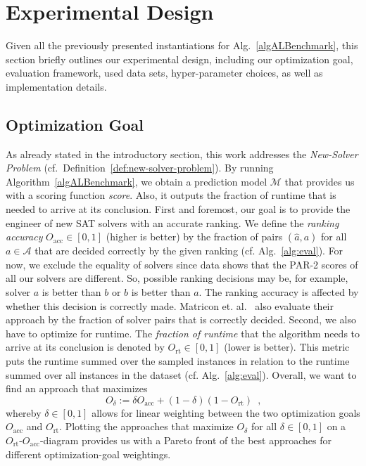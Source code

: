 \documentclass[runningheads]{llncs}
\begin{document}
\section{Experimental Design}
Given all the previously presented instantiations for Alg.~\ref{algALBenchmark}, this section briefly outlines our experimental design, including our optimization goal, evaluation framework, used data sets, hyper-parameter choices, as well as implementation details.

\subsection{Optimization Goal}
\label{sec:goal}
As already stated in the introductory section, this work addresses the \emph{New-Solver Problem} (cf.~Definition~\ref{def:new-solver-problem}).
By running Algorithm~\ref{algALBenchmark}, we obtain a prediction model $\mathcal{M}$ that provides us with a scoring function \emph{score}.
Also, it outputs the fraction of runtime that is needed to arrive at its conclusion.
First and foremost, our goal is to provide the engineer of new SAT solvers with an accurate ranking.
We define the \emph{ranking accuracy} $O_{\operatorname{acc}} \in \left[0, 1\right]$ (higher is better) by the fraction of pairs $\left(\hat{a}, a\right)$ for all $a \in \mathcal{A}$ that are decided correctly by the given ranking (cf. Alg.~\ref{alg:eval}).
For now, we exclude the equality of solvers since data shows that the PAR-2 scores of all our solvers are different.
So, possible ranking decisions may be, for example, solver $a$ is better than $b$ or $b$ is better than $a$.
The ranking accuracy is affected by whether this decision is correctly made.
Matricon et. al.~\cite{MatriconAFSH21} also evaluate their approach by the fraction of solver pairs that is correctly decided.
Second, we also have to optimize for runtime.
The \emph{fraction of runtime} that the algorithm needs to arrive at its conclusion is denoted by $O_{\operatorname{rt}} \in \left[0, 1\right]$ (lower is better).
This metric puts the runtime summed over the sampled instances in relation to the runtime summed over all instances in the dataset (cf. Alg.~\ref{alg:eval}).
Overall, we want to find an approach that maximizes
\begin{equation}
  O_\delta := \delta O_{\operatorname{acc}} + \left(1 - \delta\right) \left(1 - O_{\operatorname{rt}}\right) \enspace \textrm{,}
  \label{eq:opt}
\end{equation} 
whereby $\delta \in \left[0, 1\right]$ allows for linear weighting between the two optimization goals $O_{\operatorname{acc}}$ and $O_{\operatorname{rt}}$.
Plotting the approaches that maximize $O_\delta$ for all $\delta \in \left[0, 1\right]$ on a $O_{\operatorname{rt}}$-$O_{\operatorname{acc}}$-diagram provides us with a Pareto front of the best approaches for different optimization-goal weightings.
\end{document}
